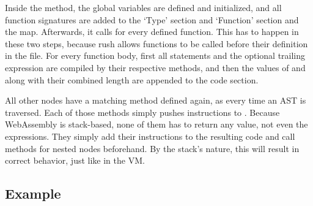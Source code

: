 Inside the  method, the global variables are defined and initialized, and all function signatures are added to the `Type' section and `Function' section and the  map.
Afterwards, it calls  for every defined function.
This has to happen in these two steps, because rush allows functions to be called before their definition in the file.
For every function body, first all statements and the optional trailing expression are compiled by their respective methods, and then the values of  and  along with their combined length are appended to the code section.

All other nodes have a matching method defined again, as every time an AST is traversed.
Each of those methods simply pushes instructions to .
Because WebAssembly is stack-based, none of them has to return any value, not even the expressions.
They simply add their instructions to the resulting code and call methods for nested nodes beforehand.
By the stack's nature, this will result in correct behavior, just like in the VM.


\subsection{Example}

